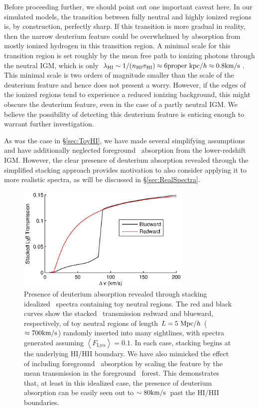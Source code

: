 Before proceeding further, we should point out one important caveat here. In our simulated models, the transition between fully neutral and highly ionized regions is, by construction, perfectly sharp. If this
transition is more gradual in reality, then the narrow deuterium feature could be overwhelmed by absorption from mostly ionized hydrogen in this transition region. A minimal scale for this transition
region is set roughly by the mean free path to ionizing photons through the neutral IGM, which is only $\lambda_{\text{HI}} \sim 1/(n_{\text{HI}} \sigma_{\text{HI}}) \approx 6 \text{proper kpc}/h \approx 0.8 \text{km}/\text{s}$.
This minimal scale is two orders of magnitude smaller than the scale of the deuterium feature and hence does not present a worry. However, if the edges of the ionized regions tend to experience
a reduced ionizing background, this might obscure the deuterium feature, even in the case of a partly neutral IGM. We believe the possibility of detecting this deuterium feature is enticing enough to
warrant further investigation.


As was the case in \S \ref{sec:ToyHI}, we have made several simplifying assumptions and have additionally neglected foreground \lya\ absorption from the lower-redshift IGM. However, the clear presence of deuterium absorption revealed through the simplified stacking approach provides motivation to also consider applying it to more realistic spectra, as will be discussed in \S \ref{sec:RealSpectra}.


\begin{figure}[h]
  \centering
  \includegraphics[width=8.4cm]{fig5.eps}
  \caption{Presence of deuterium absorption revealed through stacking idealized \lyb\ spectra containing toy neutral regions. The red and black curves show the stacked \lyb\ transmission redward and blueward, respectively, of toy neutral regions of length $L = 5\ \text{Mpc/$h$}$ ($\approx 700\text{km}/\text{s}$) randomly inserted into many sightlines, with spectra generated assuming $\left\langle F_{\text{Ly}\alpha} \right\rangle = 0.1$. In each case, stacking begins at the underlying HI/HII boundary. We have also mimicked the effect of including foreground \lya\ absorption by scaling the feature by the mean transmission in the foreground \lya\ forest. This demonstrates that, at least in this idealized case, the presence of deuterium absorption can be easily seen out to $\sim80\text{km}/\text{s}$\ past the HI/HII boundaries.}
  \label{fig:ToyD}
\end{figure}




